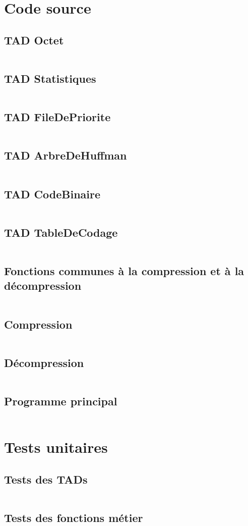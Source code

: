 \newpage
\section{Code source}
    \subsection{TAD Octet}
        \inputminted{c}{../../programme/src/octet.c}
    \subsection{TAD Statistiques}
        \inputminted{c}{../../programme/src/statistiques.c}
    \subsection{TAD FileDePriorite}
        \inputminted{c}{../../programme/src/fileDePrioriteDArbreDeHuffman.c}
    \subsection{TAD ArbreDeHuffman}
        \inputminted{c}{../../programme/src/arbreDeHuffman.c}
    \subsection{TAD CodeBinaire}
        \inputminted{c}{../../programme/src/codeBinaire.c}
    \subsection{TAD TableDeCodage}
        \inputminted{c}{../../programme/src/tableDeCodage.c}
    \subsection{Fonctions communes à la compression et à la décompression}
        \inputminted{c}{../../programme/src/construireArbreDeHuffman.c}
    \subsection{Compression}
        \inputminted{c}{../../programme/src/compression.c}
    \subsection{Décompression}
        \inputminted{c}{../../programme/src/decompression.c} 
    \subsection{Programme principal}
        \inputminted{c}{../../programme/src/main.c}

\newpage
\section{Tests unitaires}
    \subsection{Tests des TADs}
        \inputminted{c}{../../programme/src/testsTADs.c}
    \subsection{Tests des fonctions métier}
        \inputminted{c}{../../programme/src/testsFonctionsMetier.c}